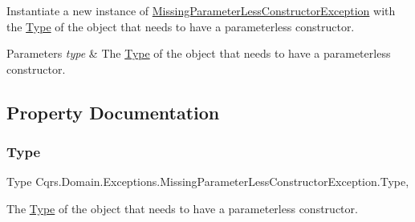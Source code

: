 Instantiate a new instance of \hyperlink{classCqrs_1_1Domain_1_1Exceptions_1_1MissingParameterLessConstructorException}{Missing\+Parameter\+Less\+Constructor\+Exception} with the \hyperlink{classCqrs_1_1Domain_1_1Exceptions_1_1MissingParameterLessConstructorException_a9350872fe9744fbd82af49b2e663ccc0_a9350872fe9744fbd82af49b2e663ccc0}{Type} of the object that needs to have a parameterless constructor. 


\begin{DoxyParams}{Parameters}
{\em type} & The \hyperlink{classCqrs_1_1Domain_1_1Exceptions_1_1MissingParameterLessConstructorException_a9350872fe9744fbd82af49b2e663ccc0_a9350872fe9744fbd82af49b2e663ccc0}{Type} of the object that needs to have a parameterless constructor.\\
\hline
\end{DoxyParams}


\subsection{Property Documentation}
\mbox{\label{classCqrs_1_1Domain_1_1Exceptions_1_1MissingParameterLessConstructorException_a9350872fe9744fbd82af49b2e663ccc0_a9350872fe9744fbd82af49b2e663ccc0}} 
\subsubsection{\texorpdfstring{Type}{Type}}
{\footnotesize\ttfamily Type Cqrs.\+Domain.\+Exceptions.\+Missing\+Parameter\+Less\+Constructor\+Exception.\+Type\hspace{0.3cm}{\ttfamily [get]}, {\ttfamily [set]}}



The \hyperlink{classCqrs_1_1Domain_1_1Exceptions_1_1MissingParameterLessConstructorException_a9350872fe9744fbd82af49b2e663ccc0_a9350872fe9744fbd82af49b2e663ccc0}{Type} of the object that needs to have a parameterless constructor. 

